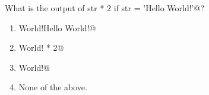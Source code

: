 \question
What is the output of \lstinline@print str * 2 if str = 'Hello World!'@?

\begin{enumerate}
\item \lstinline@Hello World!Hello World!@
\item \lstinline@Hello World! * 2@
\item \lstinline@Hello World!@
\item None of the above.
\end{enumerate}

